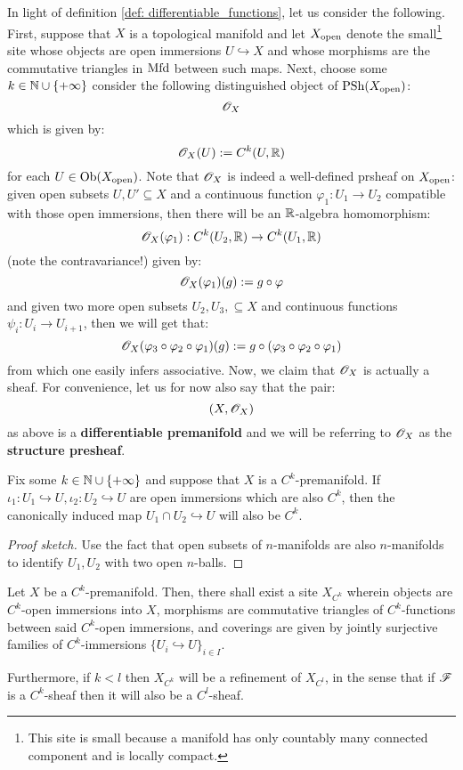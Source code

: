         In light of definition \ref{def: differentiable_functions}, let us consider the following. First, suppose that $X$ is a topological manifold and let $X_{\mathrm{open}}$ denote the small\footnote{This site is small because a manifold has only countably many connected component and is locally compact.} site whose objects are open immersions $U \hookrightarrow X$ and whose morphisms are the commutative triangles in $\mathrm{Mfd}$ between such maps. Next, choose some $k \in \mathbb{N} \cup \{+\infty\}$ consider the following distinguished object of $\mathrm{PSh}(X_{\mathrm{open}})$:
            $$\mathscr{O}_X$$
        which is given by:
            $$\mathscr{O}_X(U) := C^k(U, \mathbb{R})$$
        for each $U \in \mathrm{Ob}(X_{\mathrm{open}})$. Note that $\mathscr{O}_X$ is indeed a well-defined prsheaf on $X_{\mathrm{open}}$: given open subsets $U, U' \subseteq X$ and a continuous function $\varphi_1: U_1 \to U_2$ compatible with those open immersions, then there will be an $\mathbb{R}$-algebra homomorphism:
            $$\mathscr{O}_X(\varphi_1): C^k(U_2, \mathbb{R}) \to C^k(U_1, \mathbb{R})$$
        (note the contravariance!) given by:
            $$\mathscr{O}_X(\varphi_1)(g) := g \circ \varphi$$
        and given two more open subsets $U_2, U_3,  \subseteq X$ and continuous functions $\psi_i: U_i \to U_{i + 1}$, then we will get that:
            $$\mathscr{O}_X(\varphi_3 \circ \varphi_2 \circ \varphi_1)(g) := g \circ ( \varphi_3 \circ \varphi_2 \circ \varphi_1 )$$
        from which one easily infers associative. Now, we claim that $\mathscr{O}_X$ is actually a sheaf. For convenience, let us for now also say that the pair:
            $$(X, \mathscr{O}_X)$$
        as above is a \textbf{differentiable premanifold} and we will be referring to $\mathscr{O}_X$ as the \textbf{structure presheaf}.
        \begin{lemma} \label{lemma: pullback_of_differentiable_immersions}
            Fix some $k \in \mathbb{N} \cup \{+\infty\}$ and suppose that $X$ is a $C^k$-premanifold. If $\iota_1: U_1 \hookrightarrow U, \iota_2: U_2 \hookrightarrow U$ are open immersions which are also $C^k$, then the canonically induced map $U_1 \cap U_2 \hookrightarrow U$ will also be $C^k$.
        \end{lemma}
            \begin{proof}[Proof sketch]
                Use the fact that open subsets of $n$-manifolds are also $n$-manifolds to identify $U_1, U_2$ with two open $n$-balls.
            \end{proof}
        \begin{corollary} \label{coro: differentiable_topologies}
            Let $X$ be a $C^k$-premanifold. Then, there shall exist a site $X_{C^k}$ wherein objects are $C^k$-open immersions into $X$, morphisms are commutative triangles of $C^k$-functions between said $C^k$-open immersions, and coverings are given by jointly surjective families of $C^k$-immersions $\{U_i \hookrightarrow U\}_{i \in I}$.

            Furthermore, if $k < l$ then $X_{C^k}$ will be a refinement of $X_{C^l}$, in the sense that if $\mathscr{F}$ is a $C^k$-sheaf then it will also be a $C^l$-sheaf. 
        \end{corollary}
